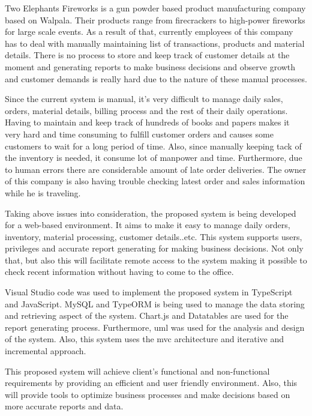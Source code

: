 \documentclass[12pt]{report}
\begin{document}
Two Elephants Fireworks is a gun powder based product manufacturing company based on Walpala. Their products range from
firecrackers to high-power fireworks for large scale events. As a result of that, currently employees of this company has to deal with manually maintaining list of transactions, products and material details. There is no process to store and keep track of customer details at the moment and generating reports to make business decisions and observe growth and customer demands is really hard due to the nature of these manual processes.

Since the current system is manual, it’s very difficult to manage daily sales, orders, material details, billing process and the rest of their daily operations. Having to maintain and keep track of hundreds of books and papers makes it very hard and time consuming to fulfill customer orders and causes some customers to wait for a long period of time. Also, since manually keeping tack of the inventory is needed, it consume lot of manpower and time. Furthermore, due to human errors there are considerable amount of late order  deliveries. The owner of this company is also having trouble checking latest order and sales information while he is traveling.

Taking above issues into consideration, the proposed system  is being developed for a web-based environment. It aims to make it easy to manage daily orders, inventory, material processing, customer details..etc. This system supports users, privileges and accurate report generating for making business decisions. Not only that, but also this will facilitate remote access to the system making it possible to check recent information without having to come to the office.

Visual Studio code was used to implement the proposed system in TypeScript and JavaScript. MySQL and TypeORM is being used to manage the data storing and retrieving aspect of the system. Chart.js and Datatables are used for the report generating process. Furthermore, \acrlong{uml} was used for the analysis and design of the system. Also, this system uses the \acrshort{mvc} architecture and iterative and incremental approach.

This proposed system will achieve client's functional and non-functional requirements by providing an efficient and user friendly environment. Also, this will provide tools to optimize business processes and make decisions based on more accurate reports and data.


\newpage
{}
\begin{singlespacing}
	\tableofcontents
\end{singlespacing}
\setlength{\parskip}{1em}
\renewcommand{\baselinestretch}{2.0}
\end{document}
